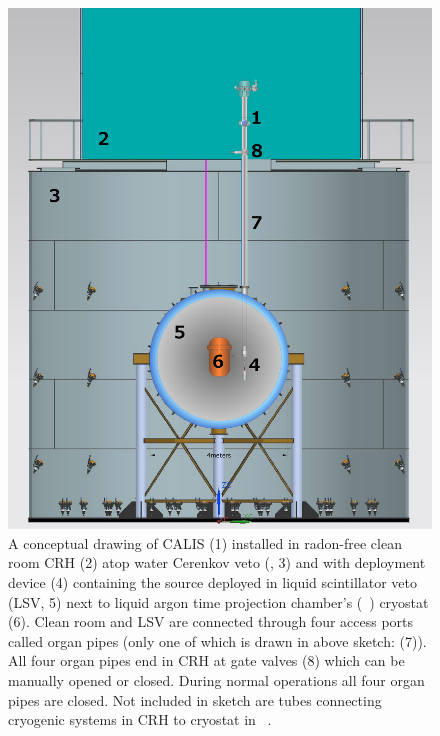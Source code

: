 \begin{figure}[htbp]
 \centering
\includegraphics[width=\textwidth]{Figures/DS50_with_CALIS}
\caption{A conceptual drawing of CALIS (1) installed in radon-free clean room CRH (2) atop water Cerenkov veto (\wcv, 3) and with deployment device (4) containing the source deployed in liquid scintillator veto (LSV, 5) next to liquid argon time projection chamber's (\lar\ \tpc) cryostat (6). Clean room and LSV are connected through four access ports called organ pipes (only one of which is drawn in above sketch: (7)). All four organ pipes end in CRH at gate valves (8) which can be manually opened or closed. During normal operations all four organ pipes are closed. Not included in sketch are tubes connecting cryogenic systems in CRH to cryostat in \lsv\ \cite{Agnes:2015qyz}.\label{fig:wholeAssembly_insideDetectors}\label{fig:DS50_with_CALIS}}
\end{figure}


